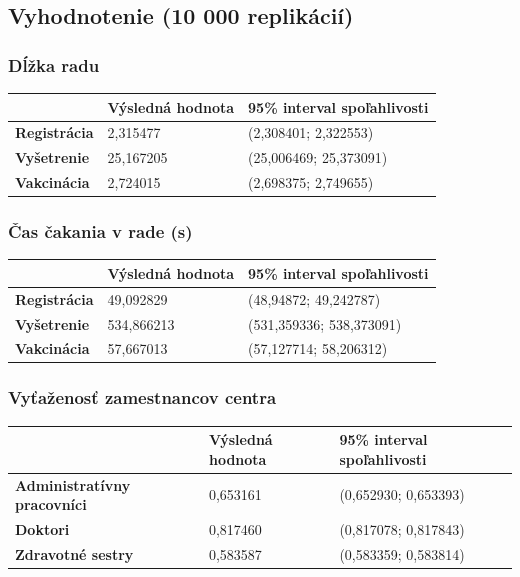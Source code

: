 \documentclass[letterpaper]{article}
\begin{document}
	\subsection*{Vyhodnotenie (10 000 replikácií)}
	
	\subsubsection*{Dĺžka radu}
	
	\begin{table}[hbt!]
		\begin{tabular}{p{6cm}|p{4.5cm}p{4.5cm}}
			& \textbf{Výsledná hodnota} & \textbf{95\% interval spoľahlivosti} \\
			\hline\hline
			\textbf{Registrácia} 	& 2,315477            & (2,308401; 2,322553)			
			\\\hline
			\textbf{Vyšetrenie}  	& 25,167205           & (25,006469; 25,373091)	
			\\\hline
			\textbf{Vakcinácia}  	& 2,724015            & (2,698375; 2,749655)
		\end{tabular}
	\end{table}
	
	\subsubsection*{Čas čakania v rade (s)}
	
	\begin{table}[hbt!]
		\begin{tabular}{p{6cm}|p{4.5cm}p{4.5cm}}
			& \textbf{Výsledná hodnota} & \textbf{95\% interval spoľahlivosti} \\
			\hline\hline
			\textbf{Registrácia} 	& 49,092829           & (48,94872; 49,242787)			
			\\\hline
			\textbf{Vyšetrenie}  	& 534,866213          & (531,359336; 538,373091)	
			\\\hline
			\textbf{Vakcinácia}  	& 57,667013           & (57,127714; 58,206312)
		\end{tabular}
	\end{table}
	
	\subsubsection*{Vyťaženosť zamestnancov centra}
	
	\begin{table}[hbt!]
		\begin{tabular}{p{6cm}|p{4.5cm}p{4.5cm}}
			& \textbf{Výsledná hodnota} & \textbf{95\% interval spoľahlivosti} \\
			\hline\hline
			\textbf{Administratívny pracovníci} 	& 0,653161            & (0,652930; 0,653393)			
			\\\hline
			\textbf{Doktori}  						& 0,817460            & (0,817078; 0,817843)	
			\\\hline
			\textbf{Zdravotné sestry}  				& 0,583587            & (0,583359; 0,583814)
		\end{tabular}
	\end{table}
	
\end{document}
